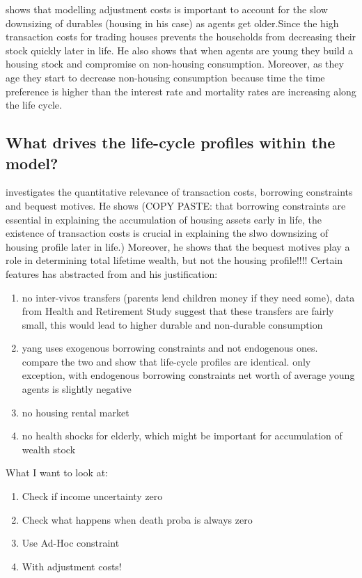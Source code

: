 \documentclass[a4paper,12pt]{article}
\begin{document}
\cite{yang2009} shows that modelling adjustment costs is important to account for the slow downsizing of durables (housing in his case) as agents get older.Since the high transaction costs for trading houses prevents the households from decreasing their stock quickly later in life. He also shows that when agents are young they build a housing stock and compromise on non-housing consumption. Moreover, as they age they start to decrease non-housing consumption because  time the time preference is higher than the interest rate and mortality rates are increasing along the life cycle. 


\subsection{What drives the life-cycle profiles within the model?}

\cite{yang2009} investigates the quantitative relevance of transaction costs, borrowing constraints and bequest motives. 
He shows (COPY PASTE: that borrowing constraints are essential in explaining the accumulation of housing assets early in life, the existence of transaction costs is crucial in explaining the slwo downsizing of housing profile later in life.)
Moreover, he shows that the bequest motives play a role in determining total lifetime wealth, but not the housing profile!!!! 
Certain features \cite{yang2009} has abstracted from and his justification:
\begin{enumerate}
\item no inter-vivos transfers (parents lend children money if they need some), data from Health and Retirement Study suggest that these transfers are fairly small, this would lead to higher durable and non-durable consumption
\item yang uses exogenous borrowing constraints and not endogenous ones. \cite{FV&K2011} compare the two and show that life-cycle profiles are identical. only exception, with endogenous borrowing constraints net worth of average young agents is slightly negative 
\item no housing rental market 
\item no health shocks for elderly, which might be important for accumulation of wealth stock
\end{enumerate}

What I want to look at:
\begin{enumerate}
\item Check if income uncertainty zero
\item Check what happens when death proba is always zero
\item Use Ad-Hoc constraint 
\item With adjustment costs!
\end{enumerate}
\end{document}
